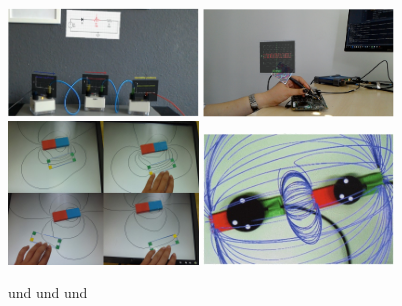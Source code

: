\begin{figure}[h!]
	\centering
	\includegraphics[width=0.45\textwidth]{images/Amiraslanov18.png}
	\hspace{0.05cm}
	\includegraphics[width=0.45\textwidth]{images/Javaheri18.png}
	\vspace{0.05cm}
	\includegraphics[width=0.45\textwidth]{images/Matsutomo13.jpg}
	\hspace{0.05cm}
	\includegraphics[width=0.45\textwidth]{images/Mannuss11.jpg}
	\caption{\cite{Amiraslanov18} und \cite{Javaheri18} und \cite{Matsutomo13} und \cite{Mannuss11}}
	\label{img:paper-collection}
\end{figure}


